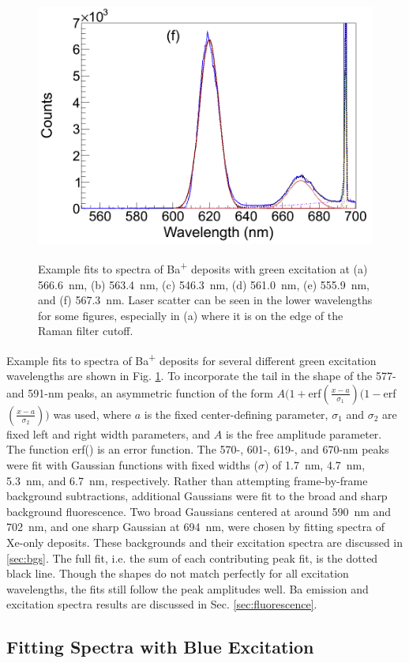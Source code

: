 \begin{figure}
                ~
                \includegraphics[width=.5\textwidth]{figures/spectra_fit_f.png}
                \caption{Example fits to spectra of Ba\textsuperscript{+} deposits with green excitation at (a) 566.6~nm, (b) 563.4~nm, (c) 546.3~nm, (d) 561.0~nm, (e) 555.9~nm, and (f) 567.3~nm.  Laser scatter can be seen in the lower wavelengths for some figures, especially in (a) where it is on the edge of the Raman filter cutoff.}
\label{fig:specFitsGrn}
\end{figure}

Example fits to spectra of Ba\textsuperscript{+} deposits for several different green excitation wavelengths are shown in Fig. \ref{fig:specFitsGrn}.  To incorporate the tail in the shape of the 577- and 591-nm peaks, an asymmetric function of the form $A(1+$erf$(\frac{x-a}{\sigma_{1}})(1-$erf$(\frac{x-a}{\sigma_{2}}))$ was used, where $a$ is the fixed center-defining parameter, $\sigma_{1}$ and $\sigma_{2}$ are fixed left and right width parameters, and $A$ is the free amplitude parameter.  The function erf() is an error function.  The 570-, 601-, 619-, and 670-nm peaks were fit with Gaussian functions with fixed widths ($\sigma$) of 1.7~nm, 4.7~nm, 5.3~nm, and 6.7~nm, respectively.  Rather than attempting frame-by-frame background subtractions, additional Gaussians were fit to the broad and sharp background fluorescence.  Two broad Gaussians centered at around 590~nm and 702~nm, and one sharp Gaussian at 694~nm, were chosen by fitting spectra of Xe-only deposits.  These backgrounds and their excitation spectra are discussed in \ref{sec:bgs}.  The full fit, i.e. the sum of each contributing peak fit, is the dotted black line.  Though the shapes do not match perfectly for all excitation wavelengths, the fits still follow the peak amplitudes well.  Ba emission and excitation spectra results are discussed in Sec. \ref{sec:fluorescence}.

\subsection{Fitting Spectra with Blue Excitation}
\label{subsec:fitblu}

